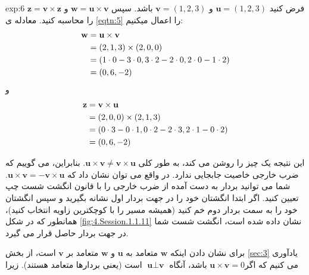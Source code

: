 {\begin{spacing}{1.5}
        \begin{example}{exp:6}
            فرض کنید $\textbf{u}=(1,2,3)$ و $\textbf{v}=(1,2,3)$ باشد. سپس $\textbf{w}=\textbf{u}\times\textbf{v}$ و $\textbf{z}=\textbf{v}\times\textbf{z}$ را محاسبه کنید. معادله ی \ref{eqtn:5} را اعمال میکنیم: \\
            \begin{equation*}
                \centering
                \begin{split}
                    \textbf{w}&=\textbf{u}\times\textbf{v}\\
                    &=(2,1,3)\times(2,0,0)\\
                    &=(1\cdot 0-3\cdot 0, 3\cdot 2-2\cdot 0, 2\cdot 0-1\cdot 2)\\
                    &=(0,6,-2)
                \end{split}
            \end{equation*}
            و
            \begin{equation*}
                \centering
                \begin{split}
                    \textbf{z}&=\textbf{v}\times\textbf{u}\\
                    &=(2,0,0)\times(2,1,3)\\
                    &=(0\cdot 3-0\cdot 1, 0\cdot 2-2\cdot 3, 2\cdot 1-0\cdot 2)\\
                    &=(0,6,-2)
                \end{split}
            \end{equation*}

            این نتیجه یک چیز را روشن می کند، به طور کلی $\textbf{u}\times\textbf{v}\neq\textbf{v}\times\textbf{u}$. بنابراین، می گوییم که ضرب خارجی خاصیت جابجایی ندارد.
            در واقع می توان نشان داد که $\textbf{u}\times\textbf{v}=-\textbf{v}\times\textbf{u}$. شما می توانید بردار به دست آمده از ضرب خارجی را با قانون انگشت شست چپ تعیین کنید.
            اگر ابتدا انگشتان خود را در جهت بردار اول نشانه بگیرید و سپس انگشتان خود را به سمت بردار دوم خم کنید (همیشه مسیر را با کوچکترین زاویه انتخاب کنید)، همانطور که در شکل \ref{fig:4.Session.1.1.11} نشان داده شده است، انگشت شست شما در جهت بردار حاصل قرار می گیرد.

            برای نشان دادن اینکه $\textbf{w}$ متعامد به $\textbf{u}$ و $\textbf{w}$ متعامد بر $\textbf{v}$ است،
            از بخش \ref{sec:3} یادآوری می کنیم که اگر$\textbf{u}\times\textbf{v}=0$ باشد،
            آنگاه $\textbf{u}\perp\textbf{v}$ است (یعنی بردارها متعامد هستند). زیرا


\end{example}
\end{spacing}}
